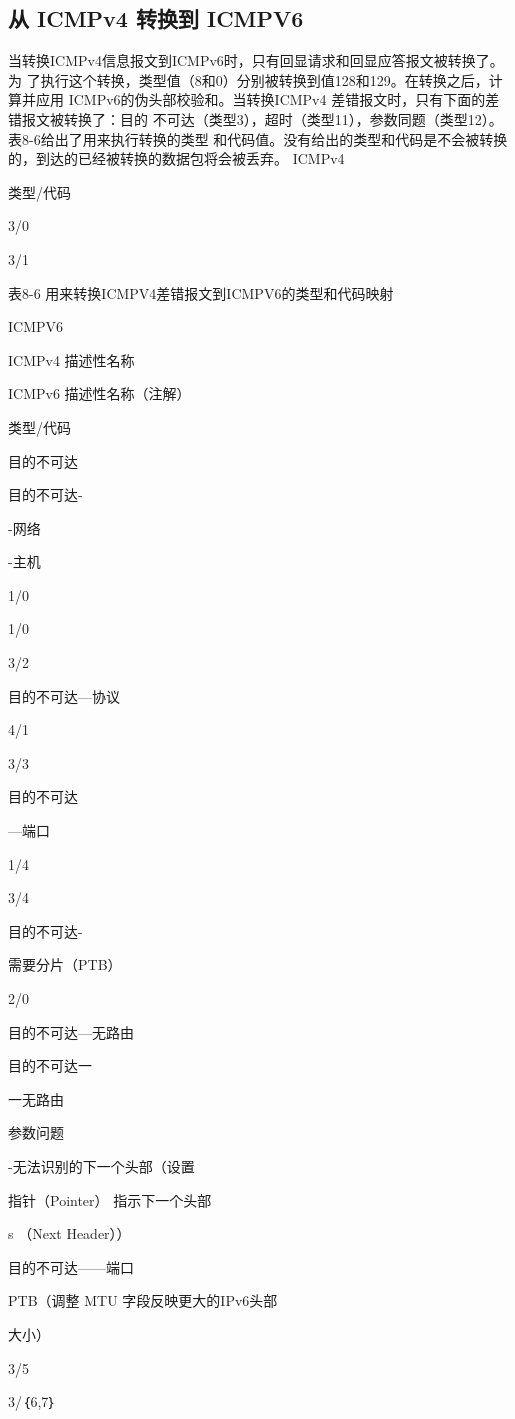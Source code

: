 \subsection{从 ICMPv4 转换到 ICMPV6}
当转换ICMPv4信息报文到ICMPv6时，只有回显请求和回显应答报文被转换了。为
了执行这个转换，类型值（8和0）分别被转换到值128和129。在转换之后，计算并应用
ICMPv6的伪头部校验和。当转换ICMPv4 差错报文时，只有下面的差错报文被转换了：目的
不可达（类型3），超时（类型11），参数同题（类型12）。表8-6给出了用来执行转换的类型
和代码值。没有给出的类型和代码是不会被转换的，到达的已经被转换的数据包将会被丢弃。
ICMPv4

类型/代码

3/0

3/1

表8-6 用来转换ICMPV4差错报文到ICMPV6的类型和代码映射

ICMPV6

ICMPv4 描述性名称

ICMPv6 描述性名称（注解）

类型/代码

目的不可达

目的不可达-

-网络

-主机

1/0

1/0

3/2

目的不可达—协议

4/1

3/3

目的不可达

—端口

1/4

3/4

目的不可达-

需要分片（PTB）

2/0

目的不可达—无路由

目的不可达一

一无路由

参数问题

-无法识别的下一个头部（设置

指针（Pointer） 指示下一个头部

s （Next Header））

目的不可达——端口

PTB（调整 MTU 字段反映更大的IPv6头部

大小）

3/5

3/｛6,7｝

